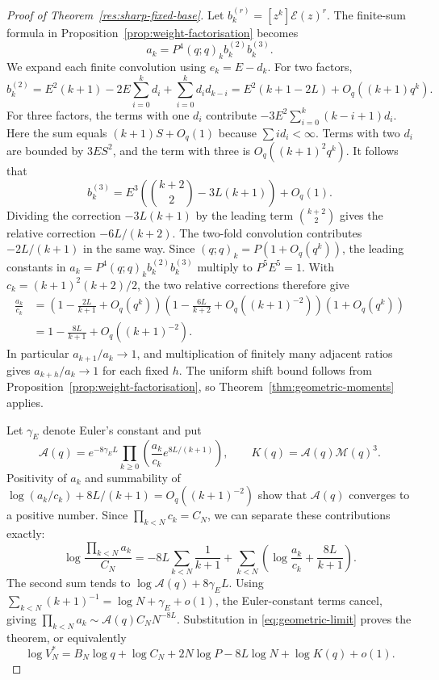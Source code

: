 \documentclass[11pt]{article}
\begin{document}
\begin{proof}[Proof of Theorem~\ref{res:sharp-fixed-base}]
Let $b_k^{(r)}=[z^k]\mathcal E(z)^r$. The finite-sum formula in
Proposition~\ref{prop:weight-factorisation} becomes
\[
 a_k=P^4(q;q)_k b_k^{(2)}b_k^{(3)}.
\]
We expand each finite convolution using $e_k=E-d_k$. For two factors,
\[
 b_k^{(2)}=E^2(k+1)-2E\sum_{i=0}^k d_i
              +\sum_{i=0}^k d_i d_{k-i}
 =E^2(k+1-2L)+O_q((k+1)q^k).
\]
For three factors, the terms with one $d_i$ contribute
$-3E^2\sum_{i=0}^k(k-i+1)d_i$.
Here the sum equals $(k+1)S+O_q(1)$ because
$\sum i d_i<\infty$. Terms with two $d_i$ are bounded by
$3E S^2$, and the term with three is $O_q((k+1)^2q^k)$.
It follows that
\[
 b_k^{(3)}=E^3\left(\binom{k+2}{2}-3L(k+1)\right)+O_q(1).
\]
Dividing the correction $-3L(k+1)$ by the leading term
$\binom{k+2}{2}$ gives the relative correction $-6L/(k+2)$.
The two-fold convolution contributes $-2L/(k+1)$ in the same way.
Since $(q;q)_k=P(1+O_q(q^k))$, the leading constants in
$a_k=P^4(q;q)_k b_k^{(2)}b_k^{(3)}$ multiply to $P^5E^5=1$.
With $c_k=(k+1)^2(k+2)/2$, the two relative corrections therefore give
\begin{align*}
 \frac{a_k}{c_k}
 &=\left(1-\frac{2L}{k+1}+O_q(q^k)\right)
   \left(1-\frac{6L}{k+2}+O_q((k+1)^{-2})\right)
   \left(1+O_q(q^k)\right)\\
 &=1-\frac{8L}{k+1}+O_q((k+1)^{-2}).
\end{align*}
In particular $a_{k+1}/a_k\to1$, and multiplication of finitely
many adjacent ratios gives $a_{k+h}/a_k\to1$ for each fixed $h$.
The uniform shift bound follows from
Proposition~\ref{prop:weight-factorisation}, so
Theorem~\ref{thm:geometric-moments} applies.

Let $\gamma_{\!E}$ denote Euler's constant and put
\begin{equation}\label{eq:fixed-constant}
 \mathcal A(q)=e^{-8\gamma_{\!E}L}
 \prod_{k\ge0}\left(\frac{a_k}{c_k}e^{8L/(k+1)}\right),
 \qquad K(q)=\mathcal A(q)\mathcal M(q)^3.
\end{equation}
Positivity of $a_k$ and summability of
$\log(a_k/c_k)+8L/(k+1)=O_q((k+1)^{-2})$
show that $\mathcal A(q)$ converges to a positive number.
Since $\prod_{k<N}c_k=C_N$, we can separate these contributions exactly:
\[
 \log\frac{\prod_{k<N}a_k}{C_N}
 =-8L\sum_{k<N}\frac1{k+1}
  +\sum_{k<N}\left(\log\frac{a_k}{c_k}+\frac{8L}{k+1}\right).
\]
The second sum tends to $\log\mathcal A(q)+8\gamma_{\!E}L$.
Using $\sum_{k<N}(k+1)^{-1}=\log N+\gamma_{\!E}+o(1)$,
the Euler-constant terms cancel, giving
$\prod_{k<N}a_k\sim\mathcal A(q)C_NN^{-8L}$.
Substitution in \eqref{eq:geometric-limit} proves the theorem, or
equivalently
\[
 \log V_N^*=B_N\log q+\log C_N+2N\log P
             -8L\log N+\log K(q)+o(1).
\]
\end{proof}
\end{document}
